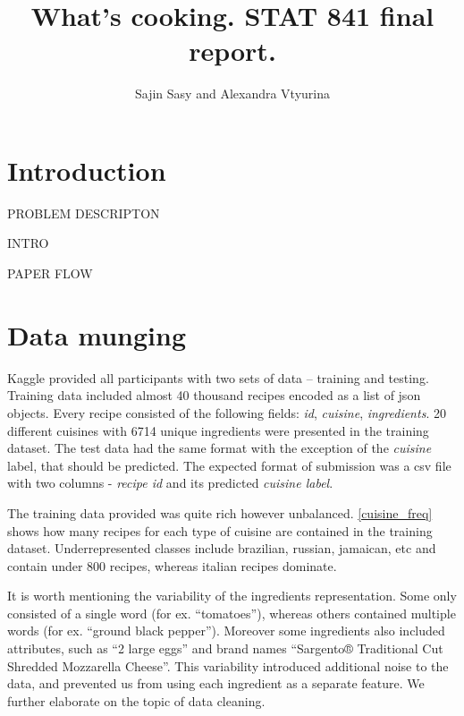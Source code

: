 \documentclass[prodmode,acmtap]{acmlarge}
\title{What's cooking. STAT 841 final report.}
\author{Sajin Sasy and Alexandra Vtyurina \affil{University of Waterloo}
}
\begin{document}


\maketitle

\section{Introduction}

PROBLEM DESCRIPTON

INTRO

PAPER FLOW

\section{Data munging}
Kaggle provided all participants with two sets of data -- training and testing. Training data included almost 40 thousand recipes encoded as a list of json objects. Every recipe consisted of the following fields: \textit{id}, \textit{cuisine}, \textit{ingredients}. 20 different cuisines with 6714
unique ingredients were presented in the training dataset. The test data had the same format with the exception of the \textit{cuisine} label, that should be predicted. The expected format of submission was a csv file with two columns - \textit{recipe id} and its predicted \textit{cuisine label}.

The training data provided was quite rich however unbalanced. \ref{cuisine_freq} shows how many recipes for each type of cuisine are contained in the training dataset. Underrepresented classes include brazilian, russian, jamaican, etc and contain under 800 recipes, whereas italian recipes dominate. 

It is worth mentioning the variability of the ingredients representation. Some only consisted of a single word (for ex. ``tomatoes''), whereas others contained multiple words (for ex. ``ground black pepper''). Moreover some ingredients also included attributes, such as ``2 large eggs'' and brand names ``Sargento® Traditional Cut Shredded Mozzarella Cheese''. This variability introduced additional noise to the data, and prevented us from using each ingredient as a separate feature. We further elaborate on the topic of data cleaning. 
\end{document}

